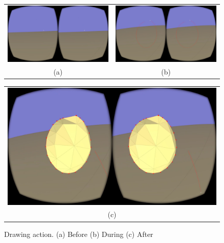 \begin{figure}[h!]
    \centering
    \setlength{\tabcolsep}{0.0130\linewidth}
    \begin{tabular}{@{}cc@{}}
    \includegraphics[width=0.45\linewidth]{figures/pre_draw} &
       	\includegraphics[width=0.45\linewidth]{figures/during_draw} \\
       	(a)&(b)\\
       	\end{tabular}
       	
       	  \centering
    \setlength{\tabcolsep}{0.0130\linewidth}
    \begin{tabular}{@{}c@{}}
    \includegraphics[width=0.926\linewidth]{figures/post_draw}\\
    (c)
    \end{tabular}
    
   
    \caption[Drawing action]{Drawing action.
    	  \textup{(a)} Before \textup{(b)} During \textup{(c)} After
      \label{fig:draw_example}}
\end{figure}

